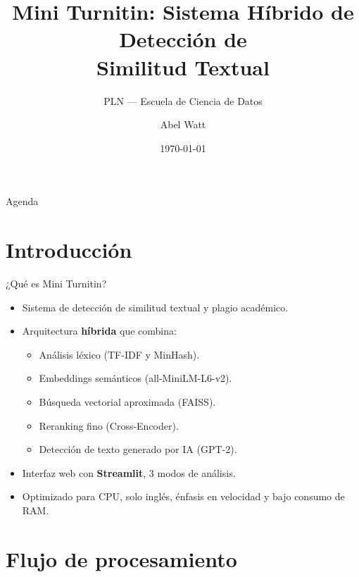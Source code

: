 \documentclass[aspectratio=169]{beamer}
\title[Mini Turnitin v2]{Mini Turnitin: Sistema Híbrido de Detección de\\Similitud Textual}
\subtitle{PLN — Escuela de Ciencia de Datos}
\author{Abel Watt}
\date{\today}
\begin{document}
\frame{\titlepage}

\begin{frame}{Agenda}
  \tableofcontents
\end{frame}

\section{Introducción}

\begin{frame}{¿Qué es Mini Turnitin?}
  \begin{itemize}
    \item Sistema de detección de similitud textual y plagio académico.
    \item Arquitectura \textbf{híbrida} que combina:
      \begin{itemize}
        \item Análisis léxico (TF-IDF y MinHash).
        \item Embeddings semánticos (all-MiniLM-L6-v2).
        \item Búsqueda vectorial aproximada (FAISS).
        \item Reranking fino (Cross-Encoder).
        \item Detección de texto generado por IA (GPT-2).
      \end{itemize}
    \item Interfaz web con \textbf{Streamlit}, 3 modos de análisis.
    \item Optimizado para CPU, solo inglés, énfasis en velocidad y bajo consumo de RAM.
  \end{itemize}
\end{frame}

\section{Flujo de procesamiento}
\end{document}
